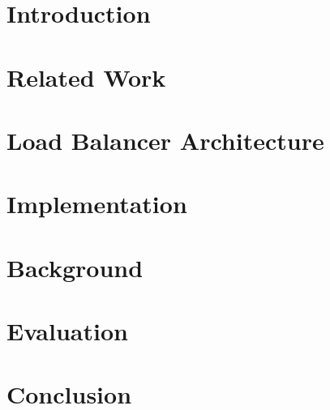 
\chapter{Introduction}\label{chapter:introduction}
\graphicspath{{Manuscript/}}


\chapter{Related Work}\label{chapter:related}
\graphicspath{{Manuscript/}}


\chapter{Load Balancer Architecture}\label{chapter:architecture}
\graphicspath{{Manuscript/}}


\chapter{Implementation}\label{chapter:implemetation}
\graphicspath{{Manuscript/}}


\chapter{Background}\label{chapter:background}
\graphicspath{{Manuscript/}}


\chapter{Evaluation}\label{chapter:evaluation}
\graphicspath{{Manuscript/}}


\chapter{Conclusion}\label{chapter:conclusion}
\graphicspath{{Manuscript/}}


